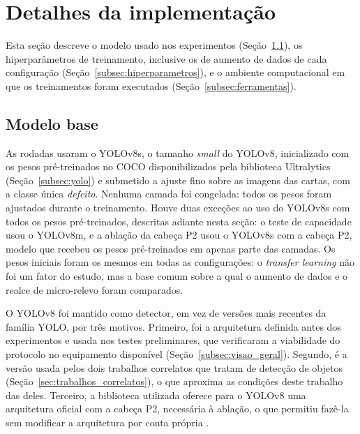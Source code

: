 \documentclass[
    12pt,                %
    openright,           %
    oneside,             %
    a4paper,             %
    english,             %
    brazil               %
]{abntex2}
\begin{document}
\section{Detalhes da implementação}
\label{sec:implementacao}

Esta seção descreve o modelo usado nos experimentos
(Seção~\ref{subsec:modelo_base}), os hiperparâmetros de treinamento,
inclusive os de aumento de dados de cada configuração
(Seção~\ref{subsec:hiperparametros}), e o ambiente computacional em que
os treinamentos foram executados (Seção~\ref{subsec:ferramentas}).

\subsection{Modelo base}
\label{subsec:modelo_base}

As rodadas usaram o YOLOv8s, o tamanho \textit{small} do YOLOv8,
inicializado com os pesos pré-treinados no COCO disponibilizados pela
biblioteca Ultralytics (Seção~\ref{subsec:yolo}) e submetido a ajuste
fino sobre as imagens das cartas, com a classe única \textit{defeito}.
Nenhuma camada foi congelada: todos os pesos foram ajustados durante o
treinamento. Houve duas exceções ao uso do YOLOv8s com todos os pesos
pré-treinados, descritas adiante nesta seção: o teste de capacidade
usou o YOLOv8m, e a ablação da cabeça P2 usou o YOLOv8s
com a cabeça P2, modelo que recebeu os pesos pré-treinados em
apenas parte das camadas. Os pesos iniciais foram os mesmos em todas
as configurações: o \textit{transfer learning} não foi um fator do
estudo, mas a base comum sobre a qual o aumento de dados e o realce de
micro-relevo foram comparados.

O YOLOv8 foi mantido como detector, em vez de versões mais recentes da
família YOLO, por três motivos. Primeiro, foi a arquitetura definida
antes dos experimentos e usada nos testes preliminares, que verificaram
a viabilidade do protocolo no equipamento disponível
(Seção~\ref{subsec:visao_geral}). Segundo, é a versão usada pelos dois
trabalhos correlatos que tratam de detecção de objetos
(Seção~\ref{sec:trabalhos_correlatos}), o que aproxima as condições
deste trabalho das deles. Terceiro, a biblioteca utilizada oferece para
o YOLOv8 uma arquitetura oficial com a cabeça P2, necessária à
ablação, o que permitiu fazê-la sem modificar a arquitetura por conta
própria \cite{Jocher2023}.
\end{document}
